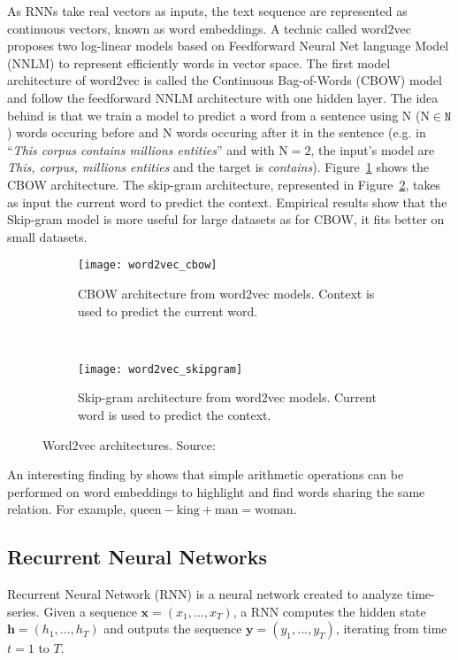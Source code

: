 As RNNs take real vectors as inputs, the text sequence are represented as continuous vectors, known as word embeddings. A technic called word2vec \citep{1301.3781} proposes two log-linear models based on Feedforward Neural Net language Model (NNLM) to represent efficiently words in vector space. The first model architecture of word2vec is called the Continuous Bag-of-Words (CBOW) model and follow the feedforward NNLM architecture with one hidden layer. The idea behind is that we train a model to predict a word from a sentence using N (N$\in \mathtt{N}$) words occuring before and N words occuring after it in the sentence (e.g. in ``\textit{This corpus contains millions entities}'' and with N$=2$, the input's model are \textit{This, corpus, millions entities} and the target is \textit{contains}). Figure~\ref{fig:cbow} shows the CBOW architecture. The skip-gram architecture, represented in Figure~\ref{fig:skipgram}, takes as input the current word to predict the context. Empirical results \citep{tf.word2vec} show that the Skip-gram model is more useful for large datasets as for CBOW, it fits better on small datasets.

\begin{figure}
    \centering
    \begin{subfigure}{.45\textwidth}
        \centering
        \texttt{[image: word2vec\_cbow]}
        \caption[Continuous Bag-of-Words architecture]{CBOW architecture from word2vec models. Context is used to predict the current word.}
        \label{fig:cbow}
    \end{subfigure}
    ~
    \begin{subfigure}{.45\textwidth}
        \centering
        \texttt{[image: word2vec\_skipgram]}
        \caption[Skip-gram architecture]{Skip-gram architecture from word2vec models. Current word is used to predict the context.}
        \label{fig:skipgram}
    \end{subfigure}
    \caption{Word2vec architectures. Source:~\citet{1301.3781}}
    \label{fig:word2vec}
\end{figure}

An interesting finding by \citet{1301.3781} shows that simple arithmetic operations can be performed on word embeddings to highlight and find words sharing the same relation. For example, $\mathrm{queen} - \mathrm{king} + \mathrm{man} = \mathrm{woman}$.

\subsection{Recurrent Neural Networks}
Recurrent Neural Network (RNN) is a neural network created to analyze time-series. Given a sequence $\bm{x} = (x_1, ..., x_T)$, a RNN computes the hidden state $\bm{h} = (h_1, ..., h_T)$ and outputs the sequence $\bm{y} = (y_1, ..., y_T)$, iterating from time $t = 1$ to $T$.

